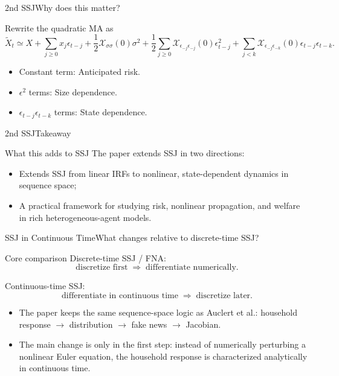 \documentclass[aspectratio=169]{beamer}
\begin{document}
\begin{frame}{2nd SSJ}{Why does this matter?}
\small

Rewrite the quadratic MA as
\[
\widetilde X_t \simeq
X
+\sum_{j\ge0} x_j \epsilon_{t-j}
+\frac12 \mathcal X_{\sigma\sigma}(0)\sigma^2
+\frac12\sum_{j\ge0}\mathcal X_{\epsilon_{-j}\epsilon_{-j}}(0)\epsilon_{t-j}^2
+\sum_{j<k}\mathcal X_{\epsilon_{-j}\epsilon_{-k}}(0)\epsilon_{t-j}\epsilon_{t-k}.
\]

\begin{itemize}
    \item Constant term:
    \alert{Anticipated risk}.
    \item $\epsilon^2$ terms:
    \alert{Size dependence}.
    \item $\epsilon_{t-j}\epsilon_{t-k}$ terms:
    \alert{State dependence}.
\end{itemize}

\end{frame}

\begin{frame}{2nd SSJ}{Takeaway \cite{auclert2025beyond}}
\small
\begin{alertblock}{What this adds to SSJ}
The paper extends SSJ in two directions:
\begin{itemize}
    \item Extends SSJ from linear IRFs to \alert{nonlinear, state-dependent} dynamics in sequence space;
    \item A practical framework for studying risk, nonlinear propagation, and welfare in rich heterogeneous-agent models.
\end{itemize}
\end{alertblock}
\end{frame}


\begin{frame}{SSJ in Continuous Time}{What changes relative to discrete-time SSJ?}
\small

\begin{block}{Core comparison}
Discrete-time SSJ / FNA:
\[
\text{discretize first} \;\Longrightarrow\; \text{differentiate numerically}.
\]

Continuous-time SSJ:
\[
\text{differentiate in continuous time} \;\Longrightarrow\; \text{discretize later}.
\]
\end{block}

\begin{itemize}
    \item The paper keeps the \alert{same sequence-space logic} as Auclert et al.:
    household response $\rightarrow$ distribution $\rightarrow$ fake news $\rightarrow$ Jacobian.
    \item The main change is only in the \alert{first step}:
    instead of numerically perturbing a nonlinear Euler equation,
    the household response is characterized analytically in continuous time.
\end{itemize}

\end{frame}
\end{document}
